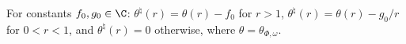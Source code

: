 For constants $f_0,g_0\in\C$: $\theta^\natural(r)=\theta(r)-f_0$ for $r>1$, $\theta^\natural(r)=\theta(r)-g_0/r$ for $0<r<1$, and $\theta^\natural(r)=0$ otherwise, where $\theta=\theta_{\Phi,\omega}$.
